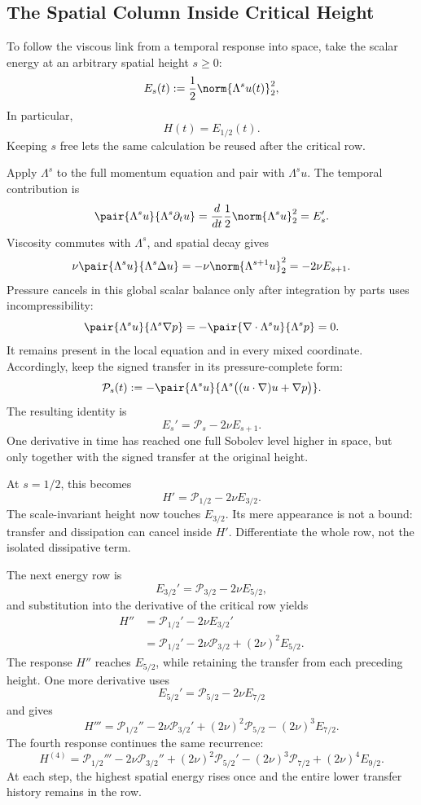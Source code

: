 
\subsection{The Spatial Column Inside Critical Height}\label{sub:TheSpatialColumnInsideCriticalHeight}

To follow the viscous link from a temporal response into space, take the scalar
energy at an arbitrary spatial height \(s\ge0\):
\[
  E_s(t)
  :=
  \frac12\norm{\Lambda^su(t)}_2^2,
\]
In particular,
\[
  H(t)=E_{1/2}(t).
\]
Keeping \(s\) free lets the same calculation be reused after the critical row.

Apply \(\Lambda^s\) to the full momentum equation and pair with
\(\Lambda^su\).  The temporal contribution is
\[
  \pair{\Lambda^su}{\Lambda^s\partial_tu}
  =
  \frac{d}{dt}\frac12\norm{\Lambda^su}_2^2
  =
  E_s'.
\]
Viscosity commutes with \(\Lambda^s\), and spatial decay gives
\[
  \nu\pair{\Lambda^su}{\Lambda^s\Delta u}
  =
  -\nu\norm{\Lambda^{s+1}u}_2^2
  =
  -2\nu E_{s+1}.
\]
Pressure cancels in this global scalar balance only after integration by parts
uses incompressibility:
\[
  \pair{\Lambda^su}{\Lambda^s\nabla p}
  =
  -\pair{\nabla\cdot\Lambda^su}{\Lambda^sp}
  =
  0.
\]
It remains present in the local equation and in every mixed coordinate.
Accordingly, keep the signed transfer in its pressure-complete form:
\[
  \mathcal P_s(t)
  :=
  -\pair{\Lambda^su}
  {\Lambda^s\bigl((u\cdot\nabla)u+\nabla p\bigr)}.
\]
The resulting identity is
\[
  E_s'
  =
  \mathcal P_s-2\nu E_{s+1}.
\]
One derivative in time has reached one full Sobolev level higher in space, but
only together with the signed transfer at the original height.

At \(s=1/2\), this becomes
\[
  H'
  =
  \mathcal P_{1/2}-2\nu E_{3/2}.
\]
The scale-invariant height now touches \(E_{3/2}\).  Its mere appearance is not
a bound: transfer and dissipation can cancel inside \(H'\).  Differentiate the
whole row, not the isolated dissipative term.

The next energy row is
\[
  E_{3/2}'
  =
  \mathcal P_{3/2}-2\nu E_{5/2},
\]
and substitution into the derivative of the critical row yields
\begin{align*}
  H''
  &=
  \mathcal P_{1/2}'-2\nu E_{3/2}'
  \\
  &=
  \mathcal P_{1/2}'
  -2\nu\mathcal P_{3/2}
  +(2\nu)^2E_{5/2}.
\end{align*}
The response \(H''\) reaches \(E_{5/2}\), while retaining the transfer from
each preceding height.  One more derivative uses
\[
  E_{5/2}'
  =
  \mathcal P_{5/2}-2\nu E_{7/2}
\]
and gives
\[
  H'''
  =
  \mathcal P_{1/2}''
  -2\nu\mathcal P_{3/2}'
  +(2\nu)^2\mathcal P_{5/2}
  -(2\nu)^3E_{7/2}.
\]
The fourth response continues the same recurrence:
\[
  H^{(4)}
  =
  \mathcal P_{1/2}'''
  -2\nu\mathcal P_{3/2}''
  +(2\nu)^2\mathcal P_{5/2}'
  -(2\nu)^3\mathcal P_{7/2}
  +(2\nu)^4E_{9/2}.
\]
At each step, the highest spatial energy rises once and the entire lower
transfer history remains in the row.

